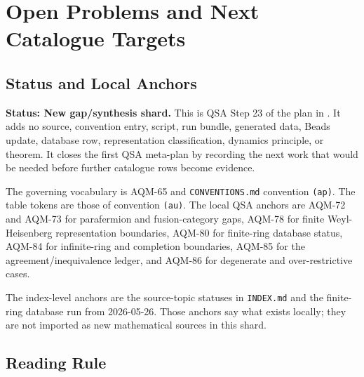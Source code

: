 
\section{Open Problems and Next Catalogue Targets}
\label{sec:qsa-open-problems-next-targets}

\subsection{Status and Local Anchors}

\textbf{Status: New gap/synthesis shard.}  This is QSA Step 23 of the plan
in .  It adds no source, convention
entry, script, run bundle, generated data, Beads update, database row,
representation classification, dynamics principle, or theorem.  It closes
the first QSA meta-plan by recording the next work that would be needed
before further catalogue rows become evidence.

The governing vocabulary is AQM-65 and \texttt{CONVENTIONS.md} convention
\texttt{(ap)}.  The table tokens are those of convention \texttt{(au)}.  The
local QSA anchors are AQM-72 and AQM-73 for parafermion and fusion-category
gaps, AQM-78 for finite Weyl-Heisenberg representation boundaries, AQM-80
for finite-ring database status, AQM-84 for infinite-ring and completion
boundaries, AQM-85 for the agreement/inequivalence ledger, and AQM-86 for
degenerate and over-restrictive cases.

The index-level anchors are the source-topic statuses in \texttt{INDEX.md}
and the finite-ring database run from 2026-05-26.  Those anchors say what
exists locally; they are not imported as new mathematical sources in this
shard.

\subsection{Reading Rule}

